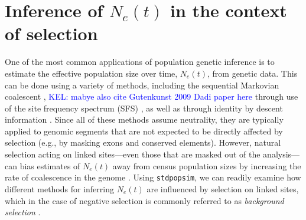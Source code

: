 \documentclass[hidelinks]{article}
\newcommand{\stdpopsim}{\texttt{stdpopsim}\xspace}
\newcommand{\kelcomment}[1]{\textcolor{blue}{KEL: #1}}
\newcommand{\drscomment}[1]{\textcolor{purple}{DRS: #1}}
\newcommand{\igcomment}[1]{\textcolor{orange}{IG: #1}}
\begin{document}
    \section*{Inference of $N_e(t)$ in the context of selection}
    One of the most common applications of population genetic inference is to estimate
    the effective population size over time, $N_e(t)$, from genetic data. This can be done
    using a variety of methods, including the sequential Markovian coalescent
    \citep{li2011inference,Schiffels2020,terhorst2017robust}, \kelcomment{mabye also cite Gutenkunst 2009 Dadi paper here} 
    through use of the site frequency spectrum (SFS) \citep{liu2020stairway},
    as well as through identity by descent information \citep{santiago2020recent}.
    Since all of these methods assume neutrality, they are typically applied to genomic
    segments that are not expected to be directly affected by selection (e.g., by masking exons
    and conserved elements).
    However, natural selection acting on linked sites---even those that are masked out of the
    analysis---can bias estimates of $N_e(t)$
    away from census population sizes by increasing the 
    rate of coalescence in the genome \citep[e.g.][]{schrider2016effects}. 
    Using \stdpopsim, we can readily examine how different methods for inferring $N_e(t)$
    are influenced by selection on linked sites,
    which in the case of negative selection is commonly referred to as \emph{background selection}
    \citep{charlesworth1993effect,hudson1995deleterious}.
\end{document}
